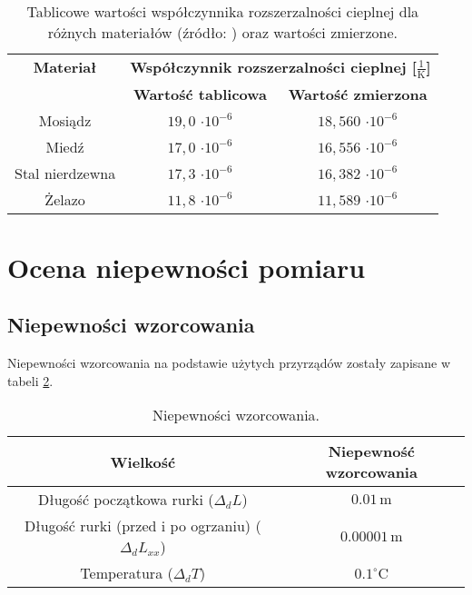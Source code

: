 \documentclass[a4paper,12pt]{article}
\begin{document}
\begin{table}[H]
    \centering
    \begin{tabular}{|c|c|c|}
        \hline
        \textbf{Materiał} & \multicolumn{2}{c|}{\textbf{Współczynnik rozszerzalności cieplnej [$\frac{1}{\text{K}}$]}} \\
        \cline{2-3}
        & \textbf{Wartość tablicowa} & \textbf{Wartość zmierzona} \\
        \hline
        Mosiądz & $19{,}0$ $\cdot 10^{-6}$ & $18{,}560$ $\cdot 10^{-6}$ \\
        \hline
        Miedź & $17{,}0$ $\cdot 10^{-6}$ & $16{,}556$ $\cdot 10^{-6}$ \\
        \hline
        Stal nierdzewna & $17{,}3$ $\cdot 10^{-6}$ & $16{,}382$ $\cdot 10^{-6}$ \\
        \hline
        Żelazo & $11{,}8$ $\cdot 10^{-6}$ & $11{,}589$ $\cdot 10^{-6}$ \\
        \hline
    \end{tabular}
    \caption{Tablicowe wartości współczynnika rozszerzalności cieplnej dla różnych materiałów (źródło: \cite{wspolczynnik_rozszeralnosci}) oraz wartości zmierzone.}
    \label{tab:materiały}
\end{table}

\section{Ocena niepewności pomiaru}


\subsection{Niepewności wzorcowania}

Niepewności wzorcowania na podstawie użytych przyrządów zostały zapisane w tabeli \ref{tab:niepewnosci}.

\begin{table}[H]
    \centering
    \begin{tabular}{|c|c|}
        \hline
        \textbf{Wielkość} & \textbf{Niepewność wzorcowania} \\
        \hline
        Długość początkowa rurki ($\Delta_d L$) & $0.01\,\text{m}$ \\
        \hline
        Długość rurki (przed i po ogrzaniu) ($\Delta_d L_{xx}$) & $0.00001\,\text{m}$ \\
        \hline
        Temperatura ($\Delta_d T$) & $0.1^\circ\text{C}$ \\
        \hline
    \end{tabular}
    \caption{Niepewności wzorcowania.}
    \label{tab:niepewnosci}
\end{table}
\end{document}
